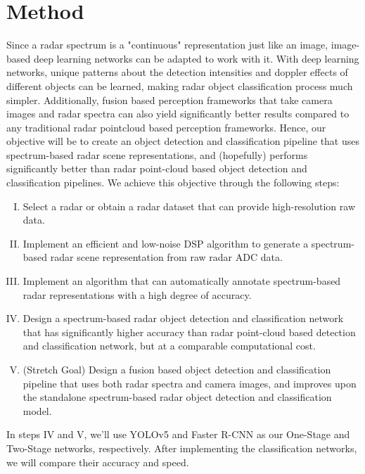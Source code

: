\documentclass{article}
\begin{document}
\section{Method}
Since a radar spectrum is a "continuous" representation just like an image, image-based deep learning networks can be adapted to work with it. With deep learning networks, unique patterns about the detection intensities and doppler effects of different objects can be learned, making radar object classification process much simpler. Additionally, fusion based perception frameworks that take camera images and radar spectra can also yield significantly better results compared to any traditional radar pointcloud based perception frameworks. Hence, our objective will be to create an object detection and classification pipeline that uses spectrum-based radar scene representations, and (hopefully) performs significantly better than radar point-cloud based object detection and classification pipelines. We achieve this objective through the following steps:
\begin{enumerate}[I.]
    \item Select a radar or obtain a radar dataset that can provide high-resolution raw data.
    \item Implement an efficient and low-noise DSP algorithm to generate a spectrum-based radar scene
    representation from raw radar ADC data.
    \item Implement an algorithm that can automatically annotate spectrum-based radar representations with a high degree of accuracy.
    \item Design a spectrum-based radar object detection and classification network that has significantly higher accuracy than radar point-cloud based detection and classification network, but at a comparable computational cost.
    \item (Stretch Goal) Design a fusion based object detection and classification pipeline that uses both radar spectra and camera images, and improves upon the standalone spectrum-based radar object detection and classification model.
\end{enumerate}
In steps IV and V, we'll use YOLOv5 and Faster R-CNN as our One-Stage and Two-Stage networks, respectively. After implementing the classification networks, we will compare their accuracy and speed.

\begin{thebibliography}{99}
\scriptsize
{}
\end{thebibliography}
\medskip
\end{document}

